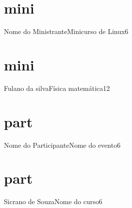 \documentclass[
    12pt,       %
    a4paper,    %
    landscape   %
]{article}
\begin{document}
    \pagestyle{empty}
	
	\part{mini}{Nome do Ministrante}{Minicurso de Linux}{6}
	\part{mini}{Fulano da silva}{Física matemática}{12}

	\part{part}{Nome do Participante}{Nome do evento}{6}
	\part{part}{Sicrano de Souza}{Nome do curso}{6}
\end{document}
